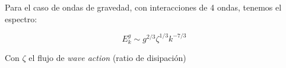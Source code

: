 Para el caso de ondas de gravedad, con interacciones de 4 ondas, tenemos el espectro:

\begin{equation}
	E^g_k \sim g^{2/3} \zeta^{1/3} k^{-7/3}
\end{equation}

Con $\zeta$ el flujo de \textit{wave action} (ratio de disipación)

%
%
%
%

%
%
% 
%
%	         
